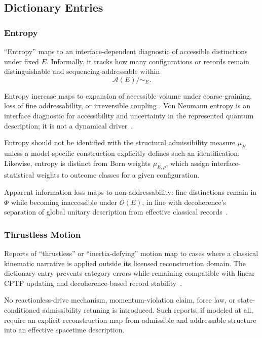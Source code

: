 \documentclass[aps,prx,onecolumn,11pt]{revtex4-2}
\theoremstyle{plain}
\theoremstyle{definition}
\theoremstyle{remark}
\begin{document}
\subsection{Dictionary Entries}
\label{appB:dictionary_entries}

\subsubsection{Entropy}
\label{appB:entropy_mapping}

``Entropy'' maps to an interface-dependent diagnostic of accessible
distinctions under fixed \(E\). Informally, it tracks how many
configurations or records remain distinguishable and
sequencing-addressable within
\[
\mathcal A(E)/{\sim_E}.
\]

Entropy increase maps to expansion of accessible volume under
coarse-graining, loss of fine addressability, or irreversible coupling
\cite{Prigogine1977,Carroll2010}. Von Neumann entropy is an interface
diagnostic for accessibility and uncertainty in the represented quantum
description; it is not a dynamical driver~\cite{vonNeumann1955,NielsenChuang2010}.

Entropy should not be identified with the structural admissibility
measure \(\mu_E\) unless a model-specific construction explicitly
defines such an identification. Likewise, entropy is distinct from Born
weights \(\mu_{E,\rho}\), which assign interface-statistical weights to
outcome classes for a given configuration.

Apparent information loss maps to non-addressability: fine distinctions
remain in \(\Phi\) while becoming inaccessible under \(\mathcal O(E)\),
in line with decoherence's separation of global unitary description
from effective classical records~\cite{Zurek2003,Zurek2005}.

\subsubsection{Thrustless Motion}
\label{appB:thrustless_motion_mapping}

Reports of ``thrustless'' or ``inertia-defying'' motion map to cases
where a classical kinematic narrative is applied outside its licensed
reconstruction domain. The dictionary entry prevents category errors
while remaining compatible with linear CPTP updating and
decoherence-based record stability~\cite{Lindblad1976,Gorini1976,Zurek2003}.

No reactionless-drive mechanism, momentum-violation claim, force law, or
state-conditioned admissibility retuning is introduced. Such reports, if
modeled at all, require an explicit reconstruction map from admissible
and addressable structure into an effective spacetime description.
\end{document}
